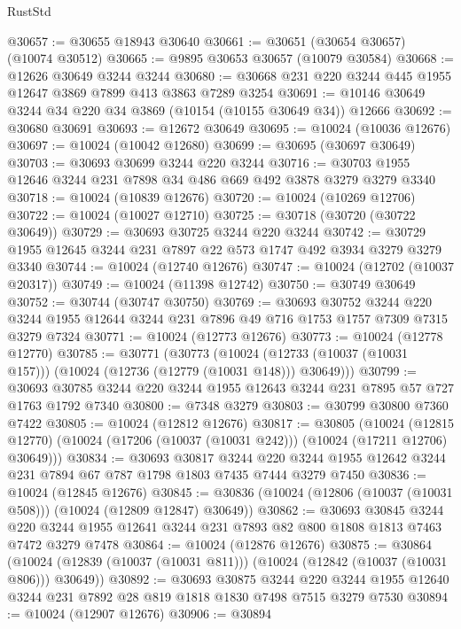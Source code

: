\begin{lexlean}{RustStd}
\begin{coremodule}
{\begin{coremodule}
{{{{{{{{{{{{{{{{{{{{{{{{{{@30657 := @30655 @18943 @30640
@30661 := @30651 (@30654 @30657) (@10074 @30512)
@30665 := @9895 @30653 @30657 (@10079 @30584)
@30668 := @12626 @30649 @3244 @3244
@30680 := @30668 @231 @220 @3244 @445 @1955 @12647 @3869 @7899 @413 @3863 @7289 @3254
@30691 := @10146 @30649 @3244 @34 @220 @34 @3869 (@10154 (@10155 @30649 @34)) @12666
@30692 := @30680 @30691
@30693 := @12672 @30649
@30695 := @10024 (@10036 @12676)
@30697 := @10024 (@10042 @12680)
@30699 := @30695 (@30697 @30649)
@30703 := @30693 @30699 @3244 @220 @3244
@30716 := @30703 @1955 @12646 @3244 @231 @7898 @34 @486 @669 @492 @3878 @3279 @3279 @3340
@30718 := @10024 (@10839 @12676)
@30720 := @10024 (@10269 @12706)
@30722 := @10024 (@10027 @12710)
@30725 := @30718 (@30720 (@30722 @30649))
@30729 := @30693 @30725 @3244 @220 @3244
@30742 := @30729 @1955 @12645 @3244 @231 @7897 @22 @573 @1747 @492 @3934 @3279 @3279 @3340
@30744 := @10024 (@12740 @12676)
@30747 := @10024 (@12702 (@10037 @20317))
@30749 := @10024 (@11398 @12742)
@30750 := @30749 @30649
@30752 := @30744 (@30747 @30750)
@30769 := @30693
    @30752
    @3244
    @220
    @3244
    @1955
    @12644
    @3244
    @231
    @7896
    @49
    @716
    @1753
    @1757
    @7309
    @7315
    @3279
    @7324
@30771 := @10024 (@12773 @12676)
@30773 := @10024 (@12778 @12770)
@30785 := @30771
    (@30773
      (@10024 (@12733 (@10037 (@10031 @157))) (@10024 (@12736 (@12779 (@10031 @148))) @30649)))
@30799 := @30693 @30785 @3244 @220 @3244 @1955 @12643 @3244 @231 @7895 @57 @727 @1763 @1792 @7340
@30800 := @7348 @3279
@30803 := @30799 @30800 @7360 @7422
@30805 := @10024 (@12812 @12676)
@30817 := @30805
    (@10024
      (@12815 @12770)
      (@10024 (@17206 (@10037 (@10031 @242))) (@10024 (@17211 @12706) @30649)))
@30834 := @30693
    @30817
    @3244
    @220
    @3244
    @1955
    @12642
    @3244
    @231
    @7894
    @67
    @787
    @1798
    @1803
    @7435
    @7444
    @3279
    @7450
@30836 := @10024 (@12845 @12676)
@30845 := @30836 (@10024 (@12806 (@10037 (@10031 @508))) (@10024 (@12809 @12847) @30649))
@30862 := @30693
    @30845
    @3244
    @220
    @3244
    @1955
    @12641
    @3244
    @231
    @7893
    @82
    @800
    @1808
    @1813
    @7463
    @7472
    @3279
    @7478
@30864 := @10024 (@12876 @12676)
@30875 := @30864
    (@10024 (@12839 (@10037 (@10031 @811))) (@10024 (@12842 (@10037 (@10031 @806))) @30649))
@30892 := @30693
    @30875
    @3244
    @220
    @3244
    @1955
    @12640
    @3244
    @231
    @7892
    @28
    @819
    @1818
    @1830
    @7498
    @7515
    @3279
    @7530
@30894 := @10024 (@12907 @12676)
@30906 := @30894
}}}}}}}}}}}}}}}}}}}}}}}}}}
\end{coremodule}}
\end{coremodule}
\end{lexlean}
